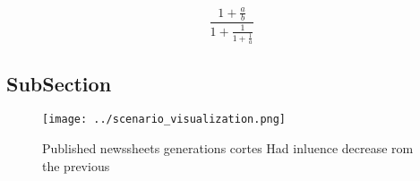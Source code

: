\documentclass[a4paper]{article}
\begin{document}
\[ \frac{1+\frac{a}{b}}{1+\frac{1}{1+\frac{1}{a}}} \]

\subsection{SubSection}

\begin{figure}
\centering
\texttt{[image: ../scenario\_visualization.png]}
\caption{Published newssheets generations cortes Had inluence decrease rom the previous 
}
\end{figure}
 
\end{document}
